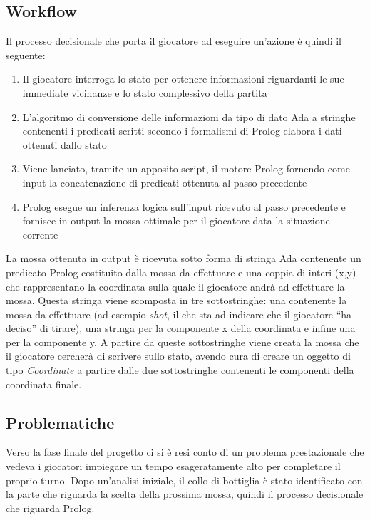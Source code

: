 \subsection{Workflow}
Il processo decisionale che porta il giocatore ad eseguire un'azione \`{e} quindi il seguente:
\begin{enumerate}
 \item Il giocatore interroga lo stato per ottenere informazioni riguardanti le sue immediate vicinanze e lo stato complessivo della partita
 \item L'algoritmo di conversione delle informazioni da tipo di dato Ada a stringhe contenenti i predicati scritti secondo i formalismi di Prolog elabora i dati ottenuti dallo stato
 \item Viene lanciato, tramite un apposito script, il motore Prolog fornendo come input la concatenazione di predicati ottenuta al passo precedente
 \item Prolog esegue un inferenza logica sull'input ricevuto al passo precedente e fornisce in output la mossa ottimale per il giocatore data la situazione corrente
 \end{enumerate} 
\noindent La mossa ottenuta in output \`{e} ricevuta sotto forma di stringa Ada contenente un predicato Prolog costituito dalla mossa da effettuare e una coppia di interi (x,y) che rappresentano la coordinata sulla quale il giocatore andr\`{a} ad effettuare la mossa. Questa stringa viene scomposta in tre sottostringhe: una contenente la mossa da effettuare (ad esempio \emph{shot}, il che sta ad indicare che il giocatore ``ha deciso'' di tirare), una stringa per la componente x della coordinata e infine una per la componente y. A partire da queste sottostringhe viene creata la mossa che il giocatore cercher\`{a} di scrivere sullo stato, avendo cura di creare un oggetto di tipo \emph{Coordinate} a partire dalle due sottostringhe contenenti le componenti della coordinata finale.

\subsection{Problematiche}
\label{sec:ai_problematiche}

Verso la fase finale del progetto ci si è resi conto di un problema prestazionale che vedeva i giocatori impiegare un tempo esageratamente alto per completare il proprio turno. Dopo un'analisi iniziale, il collo di bottiglia è stato identificato con la parte che riguarda la scelta della prossima mossa, quindi il processo decisionale che riguarda Prolog.\\

